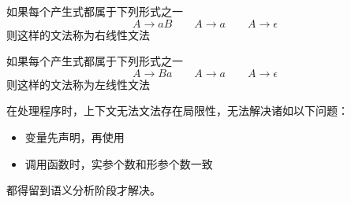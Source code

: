 \begin{definition}[右线性文法]
如果每个产生式都属于下列形式之一
\[A\to aB\qquad A\to a\qquad A\to\epsilon\]
则这样的文法称为右线性文法
\end{definition}
\begin{definition}[左线性文法]
如果每个产生式都属于下列形式之一
\[A\to Ba\qquad A\to a\qquad A\to\epsilon\]
则这样的文法称为左线性文法
\end{definition}

在处理程序时，上下文无法文法存在局限性，无法解决诸如以下问题：
\begin{itemize}
\item 变量先声明，再使用
\item 调用函数时，实参个数和形参个数一致
\end{itemize}
都得留到语义分析阶段才解决。